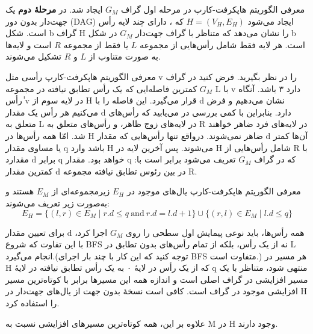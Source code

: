 \begin{itemframe}{‌معرفی الگوریتم هاپکرفت-کارپ}
\decLineSpace[-1mm]
\itm
در مرحله اول گراف $G_M$ ایجاد شد. در \textbf{مرحلهٔ دوم} یک جهت‌دار بدون دور (DAG) ایجاد می‌شود $H = (V_H, E_H)$ که ، دارای چند لایه‌ رأس است.
\itm
شکل b گراف H را نشان می‌دهد که متناظر با گراف جهت‌دار $G_M$ در شکل b است. هر لایه فقط شامل رأس‌هایی از مجموعه $L$ یا فقط از مجموعه $R$ است و لایه‌ها به صورت متناوب از $L$ و $R$ تشکیل می‌شوند.
\end{itemframe}

\begin{itemframe}{‌معرفی الگوریتم هاپکرفت-کارپ}
\itm
رأسی مثل v را در نظر بگیرید. فرض کنید در گراف $G_M$ کمترین فاصله‌ایی که یک رأس تطابق نیافته در مجموعه L با v دارد ۳ باشد. آنگاه ٰرأس v در لایه سوم از H‌ قرار می‌‌گیرد. این فاصله را با d نشان می‌دهیم و فرض می‌کنیم هر رأس یک مقدار d دارد.
\itm
بنابراین با کمی بررسی در می‌یابید که رأس‌های متعلق به L در لایه‌های زوج ظاهر، و رأس‌های متعلق به R در لایه‌های فرد ضاهر خواهند شد.
\itm
امّا همه رأس‌ها در H ضاهر نمی‌شوند. درواقع تنها رأس‌هایی که مقدار d آن‌ها کمتر یا مساوی مقدار q باشد وارد H می‌شوند. پس آخرین لایه در H شامل رأس‌هایی از R با مقدارد d برابر q خواهد بود.
\itm
مقدار q که در گراف $G_M$ تعریف می‌شود برابر است با: کمترین مقدار d در بین رئوس تطابق نیافته مجموعه R.

\end{itemframe}

\begin{itemframe}{‌معرفی الگوریتم هاپکرفت-کارپ}
\itm
یال‌های موجود در $E_H$ زیرمجموعه‌ای از $E_M$ هستند و به‌صورت زیر تعریف می‌شوند:
$$
E_H = \{ (l, r) \in E_M \mid r.d \leq q \ \text{and} \ r.d = l.d + 1 \} \cup \{ (r, l) \in E_M \mid l.d \leq q \}
$$

\itm
برای تعیین مقدار d همه رأس‌ها، باید نوعی پیمایش اول سطحی را روی $G_M$ اجرا کرد، با این تفاوت که شروع BFS نه از یک رأس، بلکه از تمام رأس‌های بدون تطابق در L انجام می‌گیرد.(توجه کنید که این کار با چند بار اجرای BFS متفاوت است.)
\itm
هر مسیر در H که از یک رأس در لایهٔ ۰ به یک رأس تطابق نیافته در لایهٔ q منتهی شود، متناظر با یک مسیر افزایشی در گراف اصلی است و اندازه همه این مسیرها برابر با کوتاه‌ترین مسیر افزایشی موجود در گراف است. کافی است نسخهٔ بدون جهت از یال‌های جهت‌دار در H را استفاده کرد.

\itm
علاوه بر این، همه کوتاه‌ترین مسیرهای افزایشی نسبت به M در H وجود دارند.
\end{itemframe}

